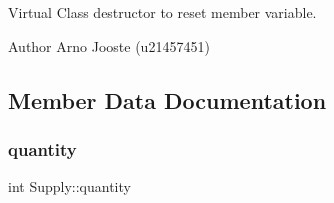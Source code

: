 Virtual Class destructor to reset member variable. 

\begin{DoxyAuthor}{Author}
Arno Jooste (u21457451) 
\end{DoxyAuthor}


\subsection{Member Data Documentation}
\mbox{\label{class_supply_a947a0ffbf0c36dc21d79c05f1a9f48a4}} 
\subsubsection{\texorpdfstring{quantity}{quantity}}
{\footnotesize\ttfamily int Supply\+::quantity\hspace{0.3cm}{\ttfamily [protected]}}

